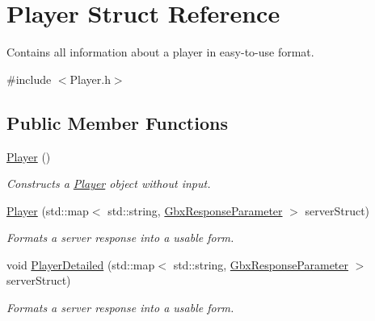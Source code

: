 \hypertarget{structPlayer}{\section{Player Struct Reference}
\label{structPlayer}
}


Contains all information about a player in easy-\/to-\/use format.  




{\ttfamily \#include $<$Player.\-h$>$}

\subsection*{Public Member Functions}
\begin{DoxyCompactItemize}
\item 
\hypertarget{structPlayer_affe0cc3cb714f6deb4e62f0c0d3f1fd8}{\hyperlink{structPlayer_affe0cc3cb714f6deb4e62f0c0d3f1fd8}{Player} ()}\label{structPlayer_affe0cc3cb714f6deb4e62f0c0d3f1fd8}

\begin{DoxyCompactList}\small\item\em Constructs a \hyperlink{structPlayer}{Player} object without input. \end{DoxyCompactList}\item 
\hyperlink{structPlayer_adf15eb006b535a4e1b72b419021f1f11}{Player} (std\-::map$<$ std\-::string, \hyperlink{classGbxResponseParameter}{Gbx\-Response\-Parameter} $>$ server\-Struct)
\begin{DoxyCompactList}\small\item\em Formats a server response into a usable form. \end{DoxyCompactList}\item 
void \hyperlink{structPlayer_a4e7c4a5bfc6fe42e23069a79f495b461}{Player\-Detailed} (std\-::map$<$ std\-::string, \hyperlink{classGbxResponseParameter}{Gbx\-Response\-Parameter} $>$ server\-Struct)
\begin{DoxyCompactList}\small\item\em Formats a server response into a usable form. \end{DoxyCompactList}\end{DoxyCompactItemize}
